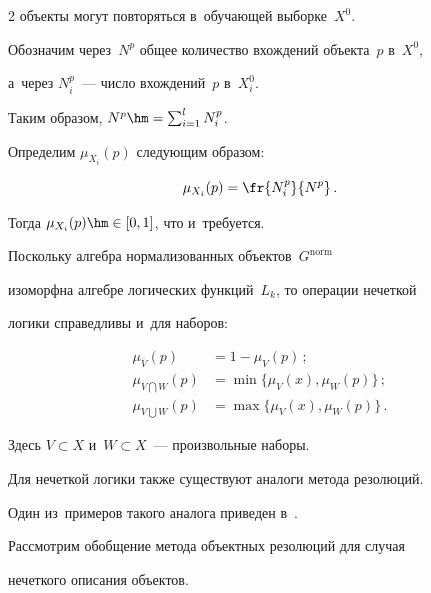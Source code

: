 \begin{multicols}{2}
 объекты могут повторяться в~обучающей выборке~$X^{0}$.


Обозначим через~$N^{p}$ общее количество вхождений объекта~$p$ в~$X^{0}$, 


а~через $ N_{i}^{p} $~--- число вхождений~$p$ в~$X_{i}^{0} $.


Таким образом, $N^{p} \hm= \sum\nolimits_{i=1}^{l} N_{i}^{p}$.


Определим $\mu_{X_{i}}(p)$ следующим образом:


$$


\mu_{X_{i}}(p) = \fr {N_{i}^{p}} {N^{p}} \,.


$$


Тогда $\mu_{X_{i}}(p)\hm \in [0,1] $, что и~требуется.





Поскольку алгебра нормализованных объектов~$G^{\mathrm{norm}}$ 


изоморфна алгебре логических функций~$L_{k}$, то операции нечеткой 


логики справедливы и~для наборов:


\begin{align*}


\mu_{\overline{V}} (p) &= 1 - \mu_{V}(p) \,; \\


\mu_{V \bigcap W}(p) &= \min\{{\mu_{V}(x), \mu_{W}(p)}\}  \,; \\


\mu_{V \bigcup W}(p) &= \max\{{\mu_{V}(x), \mu_{W}(p)}\}  \,.


\end{align*}


Здесь $ V \subset X $ и~$W \subset X $~--- произвольные наборы.





Для нечеткой логики также существуют аналоги метода резолюций.


Один из~примеров такого аналога приведен в~\cite{lee}.


Рассмотрим обобщение метода объектных резолюций для случая 


нечеткого описания объектов.








\smallskip





\noindent



\end{multicols}
